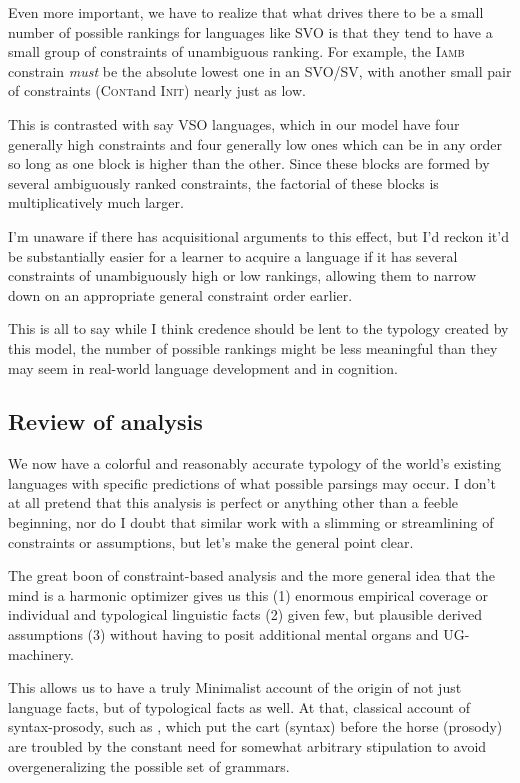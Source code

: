 \documentclass{article}
\newcommand{\cont}{\textsc{Cont}}
\newcommand{\iamb}{\textsc{Iamb}}
\newcommand{\initphi}{\textsc{Init\textphi}}
\begin{document}
Even more important, we have to realize that what drives there to be a small number of possible rankings for languages like SVO is that they tend to have a small group of constraints of unambiguous ranking.
For example, the \iamb{} constrain \emph{must} be the absolute lowest one in an SVO/SV, with another small pair of constraints (\cont and \initphi) nearly just as low.

This is contrasted with say VSO languages, which in our model have four generally high constraints and four generally low ones which can be in any order so long as one block is higher than the other. Since these blocks are formed by several ambiguously ranked constraints, the factorial of these blocks is multiplicatively much larger.

I'm unaware if there has acquisitional arguments to this effect, but I'd reckon it'd be substantially easier for a learner to acquire a language if it has several constraints of unambiguously high or low rankings, allowing them to narrow down on an appropriate general constraint order earlier.

This is all to say while I think credence should be lent to the typology created by this model, the number of possible rankings might be less meaningful than they may seem in real-world language development and in cognition.

\subsection{Review of analysis}

We now have a colorful and reasonably accurate typology of the world's existing languages with specific predictions of what possible parsings may occur.
I don't at all pretend that this analysis is perfect or anything other than a feeble beginning, nor do I doubt that similar work with a slimming or streamlining of constraints or assumptions, but let's make the general point clear.

The great boon of constraint-based analysis and the more general idea that the mind is a harmonic optimizer gives us this (1) enormous empirical coverage or individual and typological linguistic facts (2) given few, but plausible derived assumptions (3) without having to posit additional mental organs and UG-machinery.

This allows us to have a truly Minimalist account of the origin of not just language facts, but of typological facts as well.
At that, classical account of syntax-prosody, such as \parencite{halle87}, which put the cart (syntax) before the horse (prosody) are troubled by the constant need for somewhat arbitrary stipulation to avoid overgeneralizing the possible set of grammars.
\end{document}
